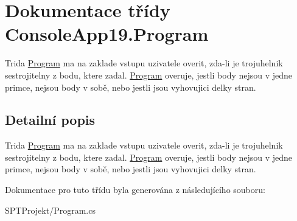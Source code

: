 \hypertarget{class_console_app19_1_1_program}{}\section{Dokumentace třídy Console\+App19.\+Program}
\label{class_console_app19_1_1_program}


Trida \hyperlink{class_console_app19_1_1_program}{Program} ma na zaklade vstupu uzivatele overit, zda-\/li je trojuhelnik sestrojitelny z bodu, ktere zadal. \hyperlink{class_console_app19_1_1_program}{Program} overuje, jestli body nejsou v jedne primce, nejsou body v sobě, nebo jestli jsou vyhovujici delky stran.  




\subsection{Detailní popis}
Trida \hyperlink{class_console_app19_1_1_program}{Program} ma na zaklade vstupu uzivatele overit, zda-\/li je trojuhelnik sestrojitelny z bodu, ktere zadal. \hyperlink{class_console_app19_1_1_program}{Program} overuje, jestli body nejsou v jedne primce, nejsou body v sobě, nebo jestli jsou vyhovujici delky stran. 



Dokumentace pro tuto třídu byla generována z následujícího souboru\+:\begin{DoxyCompactItemize}
\item 
S\+P\+T\+Projekt/Program.\+cs\end{DoxyCompactItemize}
